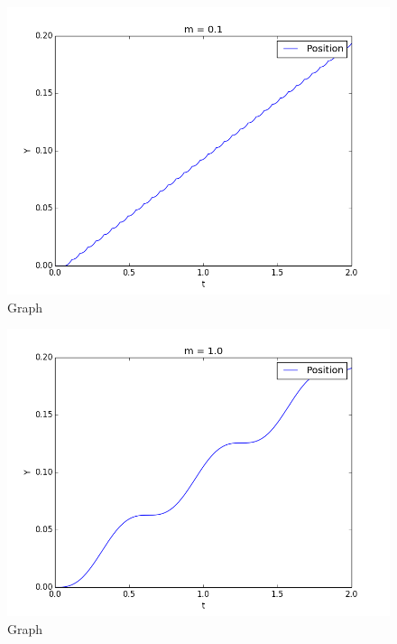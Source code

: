 \documentclass[a4paper,10pt,norsk]{article}
\begin{document}
\begin{figure}[h!]
        \includegraphics[scale=0.5]{oppg_s_1.png} 
        \caption{Graph}
\end{figure}
\begin{figure}[h!]
        \includegraphics[scale=0.5]{oppg_s_2.png} 
        \caption{Graph}
\end{figure}

\pagebreak
\end{document}
